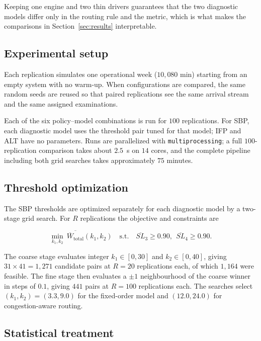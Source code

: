 \documentclass[sigconf]{acmart}
\newcommand{\Wtot}{\overline{W}_{\text{total}}}
\begin{document}
Keeping one engine and two thin drivers guarantees that the two diagnostic
models differ only in the routing rule and the metric, which is what makes the
comparisons in Section~\ref{sec:results} interpretable.

\subsection{Experimental setup}

Each replication simulates one operational week ($10{,}080$ min) starting from
an empty system with no warm-up. When configurations are compared, the same
random seeds are reused so that paired replications see the same arrival
stream and the same assigned examinations.

Each of the six policy--model combinations is run for $100$ replications. For
SBP, each diagnostic model uses the threshold pair tuned for that model; IFP
and ALT have no parameters. Runs are parallelized with
\texttt{multiprocessing}; a full $100$-replication comparison takes about
$2.5$~s on $14$ cores, and the complete pipeline including both grid searches
takes approximately $75$ minutes.

\subsection{Threshold optimization}

The SBP thresholds are optimized separately for each diagnostic model by a
two-stage grid search. For $R$ replications the objective and constraints are

\begin{equation}
\min_{k_1,k_2}\ \overline{\Wtot}(k_1,k_2)
\quad\text{s.t.}\quad
\overline{SL}_3\ge 0.90,\ \ \overline{SL}_4\ge 0.90 .
\label{eq:opt}
\end{equation}

The coarse stage evaluates integer $k_1\in[0,30]$ and $k_2\in[0,40]$, giving
$31\times41=1{,}271$ candidate pairs at $R=20$ replications each, of which
$1{,}164$ were feasible. The fine stage then evaluates a $\pm1$ neighbourhood
of the coarse winner in steps of $0.1$, giving $441$ pairs at $R=100$
replications each. The searches select $(k_1,k_2)=(3.3,9.0)$ for the
fixed-order model and $(12.0,24.0)$ for congestion-aware routing.

\subsection{Statistical treatment}
\end{document}
